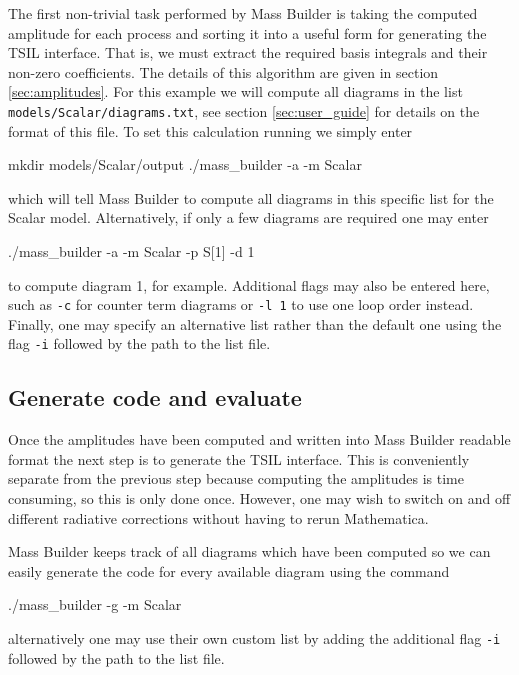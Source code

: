 The first non-trivial task performed by Mass Builder is taking the computed amplitude for each process and sorting it into a useful form for generating the TSIL interface.  That is, we must extract the required basis integrals and their non-zero coefficients.  The details of this algorithm are given in section \ref{sec:amplitudes}.  For this example we will compute all diagrams in the list \lstinline{models/Scalar/diagrams.txt}, see section \ref{sec:user_guide} for details on the format of this file.  To set this calculation running we simply enter
\begin{lstterm}
mkdir models/Scalar/output
./mass_builder -a -m Scalar
\end{lstterm}
which will tell Mass Builder to compute all diagrams in this specific list for the Scalar model.  Alternatively, if only a few diagrams are required one may enter
\begin{lstterm}
./mass_builder -a -m Scalar -p S[1] -d 1
\end{lstterm}
to compute diagram 1, for example.  Additional flags may also be entered here, such as \lstinline{-c} for counter term diagrams or \lstinline{-l 1} to use one loop order instead.  Finally, one may specify an alternative list rather than the default one using the flag \lstinline{-i} followed by the path to the list file.


\subsection{Generate code and evaluate}

Once the amplitudes have been computed and written into Mass Builder readable format the next step is to generate the TSIL interface.  This is conveniently separate from the previous step because computing the amplitudes is time consuming, so this is only done once.  However, one may wish to switch on and off different radiative corrections without having to rerun Mathematica.

Mass Builder keeps track of all diagrams which have been computed so we can easily generate the code for every available diagram using the command
\begin{lstterm}
./mass_builder -g -m Scalar
\end{lstterm}
alternatively one may use their own custom list by adding the additional flag \lstinline{-i} followed by the path to the list file.  

